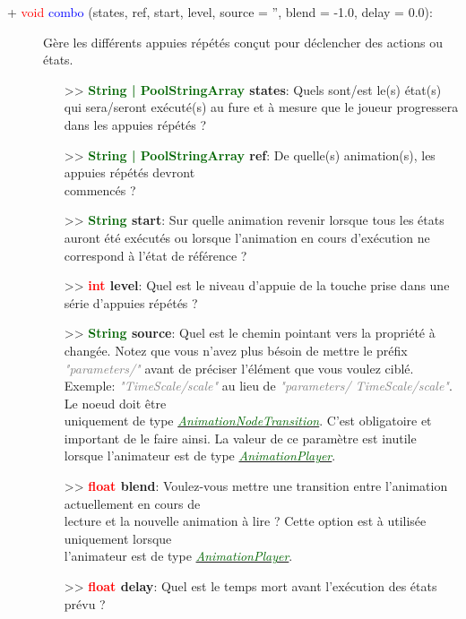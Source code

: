 \documentclass[a4paper, 11pt]{article}
\begin{document}
	\begin{description}
		\item [+ \textcolor{red}{void} \textcolor{blue}{combo} (states, ref, start, level, source = '', 
		blend = -1.0, delay = 0.0):] Gère les différents appuies répétés conçut pour déclencher des actions 
		ou états.
		\begin{itemize}
			\item [>> \textbf{\textcolor{darkgreen}{String | PoolStringArray} states}:] Quels sont/est le(s) 
			état(s) qui sera/seront exécuté(s) au fure et à mesure que le joueur progressera dans les 
			appuies répétés ?
			\item [>> \textbf{\textcolor{darkgreen}{String | PoolStringArray} ref}:] De quelle(s) 
			animation(s), les appuies répétés devront \\commencés ?
			\item [>> \textbf{\textcolor{darkgreen}{String} start}:] Sur quelle animation revenir lorsque 
			tous les états auront été exécutés ou lorsque l'animation en cours d'exécution ne correspond à 
			l'état de référence ?
			\item [>> \textbf{\textcolor{red}{int} level}:] Quel est le niveau d'appuie de la touche prise
			dans une série d'appuies répétés ?
			\item [>> \textbf{\textcolor{darkgreen}{String} source}:] Quel est le chemin pointant vers la
			propriété à changée. Notez que vous n'avez plus bésoin de mettre le préfix \textcolor{gray}
			{\textit{"parameters/"}} avant de préciser l'élément que vous voulez ciblé. Exemple: 
			\textcolor{gray}{\textit{"TimeScale/scale"}} au lieu de \textcolor{gray}{\textit{"parameters/
			TimeScale/scale"}}. Le noeud doit être \\uniquement de type
			\href{https://docs.godotengine.org/fr/stable/classes/class_animationnodetransition.html}
			{\textit{\textcolor{darkgreen}{AnimationNodeTransition}}}. C'est obligatoire et important de le 
			faire ainsi. La valeur de ce paramètre est inutile lorsque l'animateur est de type
			\href{https://docs.godotengine.org/fr/stable/classes/class_animationplayer.html}
			{\textit{\textcolor{darkgreen}{AnimationPlayer}}}.
			\item [>> \textbf{\textcolor{red}{float} blend}:] Voulez-vous mettre une transition entre 
			l'animation actuellement en cours de \\lecture et la nouvelle animation à lire ? Cette option
			est à utilisée uniquement lorsque \\l'animateur est de type
			\href{https://docs.godotengine.org/fr/stable/classes/class_animationplayer.html}
			{\textit{\textcolor{darkgreen}{AnimationPlayer}}}.
			\item [>> \textbf{\textcolor{red}{float} delay}:] Quel est le temps mort avant l'exécution des 
			états prévu ?\\
		\end{itemize}
	\end{description}
\end{document}
